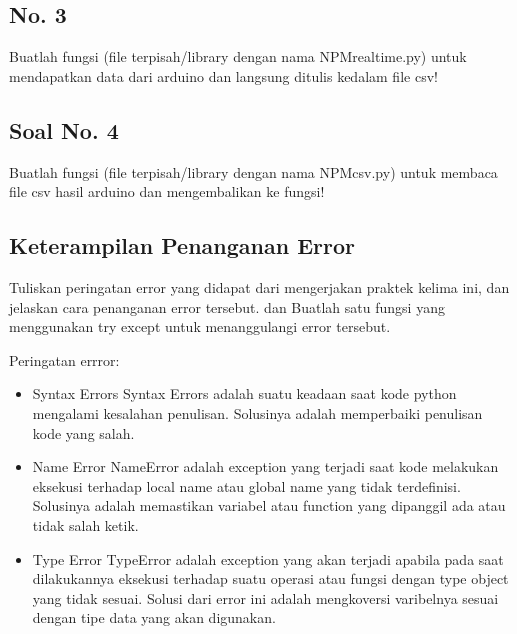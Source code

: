 

\subsection{No. 3}
Buatlah  fungsi  (file  terpisah/library  dengan  nama  NPMrealtime.py) untuk mendapatkan data dari arduino dan langsung ditulis kedalam file csv!



\subsection{Soal No. 4}
Buatlah fungsi (file terpisah/library dengan nama NPMcsv.py) untuk membaca file csv hasil arduino dan mengembalikan ke fungsi!



\subsection{Keterampilan Penanganan Error}
Tuliskan  peringatan  error  yang  didapat  dari  mengerjakan  praktek  kelima  ini, dan  jelaskan  cara  penanganan  error  tersebut.   dan  Buatlah  satu  fungsi  yang menggunakan try except untuk menanggulangi error tersebut.

\hfill \break
Peringatan errror:
\begin{itemize}
	\item Syntax Errors
	Syntax Errors adalah suatu keadaan saat kode python mengalami kesalahan penulisan. Solusinya adalah memperbaiki penulisan kode yang salah.
	
	\item Name Error
	NameError adalah exception yang terjadi saat kode melakukan eksekusi terhadap local name atau global name yang tidak terdefinisi. Solusinya adalah memastikan variabel atau function yang dipanggil ada atau tidak salah ketik.
	
	\item Type Error
	TypeError adalah exception yang akan terjadi apabila pada saat dilakukannya eksekusi terhadap suatu operasi atau fungsi dengan type object yang tidak sesuai. Solusi dari error ini adalah mengkoversi varibelnya sesuai dengan tipe data yang akan digunakan.
\end{itemize}

